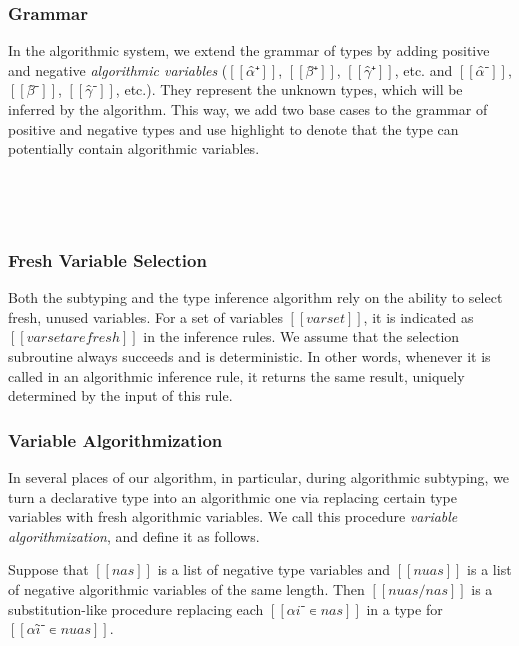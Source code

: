 \subsubsection{Grammar}

In the algorithmic system, we extend the grammar of types
by adding positive and negative \emph{algorithmic variables}
($[[α̂⁺]]$, $[[β̂⁺]]$, $[[γ̂⁺]]$, etc. and $[[α̂⁻]]$, $[[β̂⁻]]$, $[[γ̂⁻]]$, etc.).
They represent the unknown types, which will be inferred by the algorithm.
This way, we add two base cases to the grammar of 
positive and negative types and use highlight to denote that the type
can potentially contain algorithmic variables.

\begin{definition}
  \label{def:algo-types}
  \hfill
  \begin{multicols}{2}
    \ottgrammartabular{
      \ottuN\ottinterrule
    }
    \columnbreak\\
    \ottgrammartabular{
      \ottuP\ottinterrule
    }
  \end{multicols}
  \hfill\\
\end{definition}

\subsubsection{Fresh Variable Selection}
\label{sec:fresh-selection}
Both the subtyping and the type inference algorithm
rely on the ability to select fresh, unused variables.
For a set of variables $[[varset]]$, it is indicated as 
$[[varset are fresh]]$ in the inference rules.
We assume that the selection subroutine always succeeds and is 
deterministic. In other words, whenever it is called in 
an algorithmic inference rule, it returns the same result, 
uniquely determined by the input of this rule.

\subsubsection{Variable Algorithmization}
\label{sec:variable-algorithmization}

In several places of our algorithm, in particular, during
algorithmic subtyping,
we turn a declarative type into an algorithmic one
via replacing certain type variables with fresh algorithmic variables.
We call this procedure \emph{variable algorithmization}, and define it as follows.

\begin{definition}
  Suppose that $[[nas]]$ is a list of negative type variables
  and $[[nuas]]$ is a list of negative algorithmic variables of the same length. 
  Then $[[ nuas/nas ]]$ is a substitution-like procedure replacing each $[[αi⁻ ∊ {nas}]]$
  in a type for $[[αî⁻ ∊ {nuas}]]$.
\end{definition}

